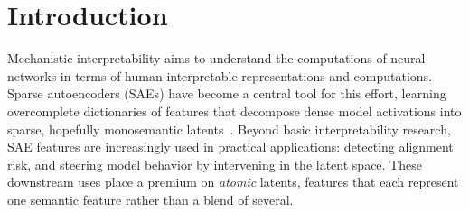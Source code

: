 \documentclass{article} %
\begin{document}
\begin{abstract}
On GPT-2 large (layer 20), the selected configuration reduces mean $|\varphi|$ by
7.5\% relative to an identical solo SAE trained on the same data.
Automated interpretability (fuzzing) scores improve by 7.6\%,
providing external validation of the atomicity gain independent of the
training and co-occurrence metrics.
Reconstruction overhead is modest. The joint SAE increases CE loss by 3.1\%
above the baseline language model. This compares to 2.5\% for the solo SAE alone,
an additional overhead of 0.6 percentage points.
Results on Gemma 2 9B are directional. On not-fully-converged SAEs, the same
parameterization yields the best results, a $+8.6\%$ $\Delta$Fuzz.
Though directional, this is an encouraging sign that the method transfers to a larger model.
Qualitative analysis confirms that features firing on polysemantic tokens are split
into semantically distinct sub-features, each specializing in a distinct
representational subspace.
\end{abstract}

\section{Introduction}
\label{sec:intro}

Mechanistic interpretability aims to understand the computations of neural networks
in terms of human-interpretable representations and computations.
Sparse autoencoders (SAEs) have become a central tool for this effort, learning
overcomplete dictionaries of features that decompose dense model activations into
sparse, hopefully monosemantic latents~\citep{bricken2023monosemanticity,
cunningham2023sparse, templeton2024scaling}.
Beyond basic interpretability research, SAE features are increasingly used in
practical applications: detecting alignment risk,
and steering model behavior by intervening in the latent space.
These downstream uses place a premium on \emph{atomic} latents, features that
each represent one semantic feature rather than a blend of several.
\end{document}
